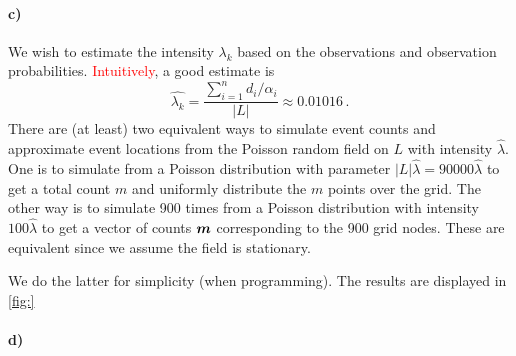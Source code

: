 \paragraph{c)}
We wish to estimate the intensity $\lambda_k$ based on the observations and observation probabilities. \textcolor{red}{Intuitively}, a good estimate is
%
\begin{equation*}
    \hat{\lambda_k} = \frac{\sum_{i=1}^n d_i / \alpha_i}{|L|} \approx 0.01016 \, .
\end{equation*}
%
There are (at least) two equivalent ways to simulate event counts and approximate event locations from the Poisson random field on $L$ with intensity $\hat{\lambda}$. One is to simulate from a Poisson distribution with parameter $|L|\hat{\lambda} = 90000\hat{\lambda}$ to get a total count $m$ and uniformly distribute the $m$ points over the grid. The other way is to simulate 900 times from a Poisson distribution with intensity $100\hat{\lambda}$ to get a vector of counts $\bm{m}$ corresponding to the 900 grid nodes. These are equivalent since we assume the field is stationary.

We do the latter for simplicity (when programming). The results are displayed in \ref{fig:}

\paragraph{d)}